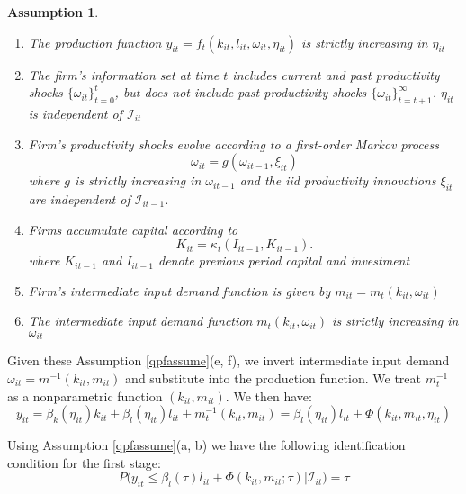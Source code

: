 \documentclass[11pt]{article}
\newtheorem{assump}{Assumption}[section]
\begin{document}
\begin{assump} \label{qpfassume}
~
\begin{enumerate}[label=(\alph*)]
	\item The production function $y_{it}=f_{t}(k_{it}, l_{it}, \omega_{it}, \eta_{it})$ is strictly increasing in $\eta_{it}$
	\item The firm's information set at time $t$ includes current and past productivity shocks $\{\omega_{it}\}_{t=0}^{t}$, but does not include past productivity shocks $\{\omega_{it}\}_{t=t+1}^{\infty}$. $\eta_{it}$ is independent of $\mathcal{I}_{it}$
	\item Firm's productivity shocks evolve according to a first-order Markov process
	\begin{equation}
	\omega_{it}=g(\omega_{it-1}, \xi_{it})
	\end{equation}
	where $g$ is strictly increasing in $\omega_{it-1}$ and the iid productivity innovations $\xi_{it}$ are independent of $\mathcal{I}_{it-1}$.
	\item Firms accumulate capital according to
	\begin{equation}
	    K_{it}=\kappa_{t}(I_{it-1}, K_{it-1}).
	\end{equation}
	where $K_{it-1}$ and $I_{it-1}$ denote previous period capital and investment
	\item Firm's intermediate input demand function is given by $m_{it}=m_{t}(k_{it}, \omega_{it})$
	\item The intermediate input demand function $m_{t}(k_{it}, \omega_{it})$ is strictly increasing in $\omega_{it}$
\end{enumerate}
\end{assump}

Given these Assumption \eqref{qpfassume}(e, f), we invert intermediate input demand $\omega_{it}=m^{-1}(k_{it}, m_{it})$ and substitute into the production function. We treat $m_{t}^{-1}$ as a nonparametric function $(k_{it}, m_{it})$. We then have:
\begin{equation} \label{qpf1st}
y_{it}=\beta_{k}(\eta_{it})k_{it}+\beta_{l}(\eta_{it})l_{it}+m_{t}^{-1}(k_{it}, m_{it})=\beta_{l}(\eta_{it})l_{it}+\Phi(k_{it}, m_{it}, \eta_{it})
\end{equation}

Using Assumption \eqref{qpfassume}(a, b) we have the following identification condition for the first stage:
\begin{equation}
	P\big(y_{it}\leq \beta_{l}(\tau)l_{it}+\Phi(k_{it}, m_{it}; \tau)\big|\mathcal{I}_{it})=\tau
\end{equation}
\end{document}

